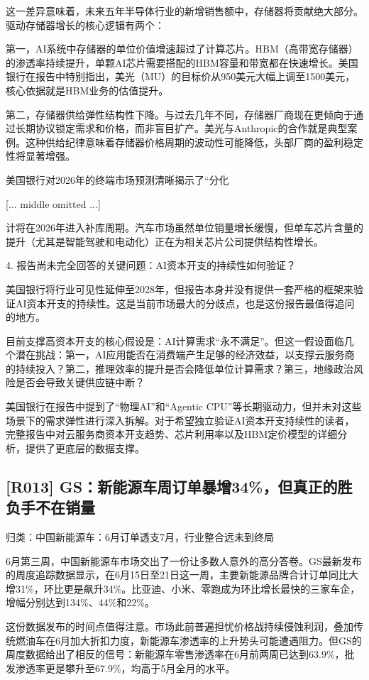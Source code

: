 \documentclass[11pt]{ctexart}
\begin{document}
这一差异意味着，未来五年半导体行业的新增销售额中，存储器将贡献绝大部分。驱动存储器增长的核心逻辑有两个：

第一，AI系统中存储器的单位价值增速超过了计算芯片。HBM（高带宽存储器）的渗透率持续提升，单颗AI芯片需要搭配的HBM容量和带宽都在快速增长。美国银行在报告中特别指出，美光（MU）的目标价从950美元大幅上调至1500美元，核心依据就是HBM业务的估值提升。

第二，存储器供给弹性结构性下降。与过去几年不同，存储器厂商现在更倾向于通过长期协议锁定需求和价格，而非盲目扩产。美光与Anthropic的合作就是典型案例。这种供给纪律意味着存储器价格周期的波动性可能降低，头部厂商的盈利稳定性将显著增强。

美国银行对2026年的终端市场预测清晰揭示了“分化

[... middle omitted ...]

计将在2026年进入补库周期。汽车市场虽然单位销量增长缓慢，但单车芯片含量的提升（尤其是智能驾驶和电动化）正在为相关芯片公司提供结构性增长。

4. 报告尚未完全回答的关键问题：AI资本开支的持续性如何验证？

美国银行将行业可见性延伸至2028年，但报告本身并没有提供一套严格的框架来验证AI资本开支的持续性。这是当前市场最大的分歧点，也是这份报告最值得追问的地方。

目前支撑高资本开支的核心假设是：AI计算需求“永不满足”。但这一假设面临几个潜在挑战：第一，AI应用能否在消费端产生足够的经济效益，以支撑云服务商的持续投入？第二，推理效率的提升是否会降低单位计算需求？第三，地缘政治风险是否会导致关键供应链中断？

美国银行在报告中提到了“物理AI”和“Agentic CPU”等长期驱动力，但并未对这些场景下的需求弹性进行深入拆解。对于希望独立验证AI资本开支持续性的读者，完整报告中对云服务商资本开支趋势、芯片利用率以及HBM定价模型的详细分析，提供了更底层的数据支撑。

\subsection{[R013] GS：新能源车周订单暴增34\%，但真正的胜负手不在销量}
{\small\color{refgray}归类：中国新能源车：6月订单透支7月，行业整合远未到终局}

6月第三周，中国新能源车市场交出了一份让多数人意外的高分答卷。GS最新发布的周度追踪数据显示，在6月15日至21日这一周，主要新能源品牌合计订单同比大增31\%，环比更是飙升34\%。比亚迪、小米、零跑成为环比增长最快的三家车企，增幅分别达到134\%、44\%和22\%。

这份数据发布的时间点值得注意。市场此前普遍担忧价格战持续侵蚀利润，叠加传统燃油车在6月加大折扣力度，新能源车渗透率的上升势头可能遭遇阻力。但GS的周度数据给出了相反的信号：新能源车零售渗透率在6月前两周已达到63.9\%，批发渗透率更是攀升至67.9\%，均高于5月全月的水平。
\end{document}
